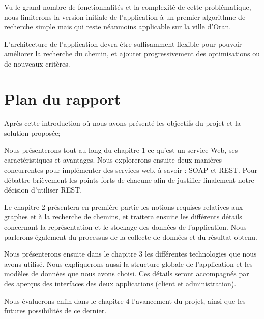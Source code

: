 Vu le grand nombre de fonctionnalités et la complexité de cette problématique, nous limiterons la version initiale de l'application à un premier algorithme de recherche simple mais qui reste néanmoins applicable sur la ville d'Oran.

L'architecture de l'application devra être suffisamment flexible pour pouvoir améliorer la recherche du chemin, et ajouter progressivement des optimisations ou de nouveaux critères.

\section{Plan du rapport}

Après cette introduction où nous avons présenté les objectifs du projet et la solution proposée;

Nous présenterons tout au long du chapitre 1 ce qu'est un service Web, ses caractéristiques et avantages. Nous explorerons ensuite deux manières concurrentes pour implémenter des services web, à savoir : SOAP et REST. Pour débattre brièvement les points forts de chacune afin de justifier finalement notre décision d'utiliser REST.

Le chapitre 2 présentera en première partie les notions requises relatives aux graphes et à la recherche de chemins, et traitera ensuite les différents détails concernant la représentation et le stockage des données de l'application. Nous parlerons également du processus de la collecte de données et du résultat obtenu.

Nous présenterons ensuite dans le chapitre 3 les différentes technologies que nous avons utilisé. Nous expliquerons aussi la structure globale de l'application et les modèles de données que nous avons choisi. Ces détails seront accompagnés par des aperçus des interfaces des deux applications (client et administration).

Nous évaluerons enfin dans le chapitre 4 l'avancement du projet, ainsi que les futures possibilités de ce dernier.

\renewcommand{\thesection}{\thechapter.\arabic{section}}
